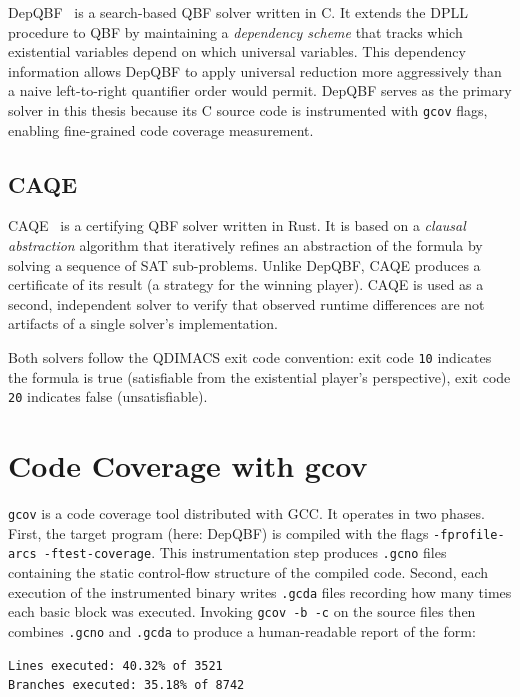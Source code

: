 DepQBF~\cite{LonsingBiere2010} is a search-based QBF solver written in C. It extends the DPLL procedure to QBF by maintaining a \emph{dependency scheme} that tracks which existential variables depend on which universal variables. This dependency information allows DepQBF to apply universal reduction more aggressively than a naive left-to-right quantifier order would permit. DepQBF serves as the primary solver in this thesis because its C source code is instrumented with \texttt{gcov} flags, enabling fine-grained code coverage measurement.

\subsection{CAQE}\label{subsec:caqe}

CAQE~\cite{RabeTentrup2015} is a certifying QBF solver written in Rust. It is based on a \emph{clausal abstraction} algorithm that iteratively refines an abstraction of the formula by solving a sequence of SAT sub-problems. Unlike DepQBF, CAQE produces a certificate of its result (a strategy for the winning player). CAQE is used as a second, independent solver to verify that observed runtime differences are not artifacts of a single solver's implementation.

Both solvers follow the QDIMACS exit code convention: exit code \texttt{10} indicates the formula is true (satisfiable from the existential player's perspective), exit code \texttt{20} indicates false (unsatisfiable).

\section{Code Coverage with gcov}\label{sec:gcov}

\texttt{gcov} is a code coverage tool distributed with GCC. It operates in two phases. First, the target program (here: DepQBF) is compiled with the flags \texttt{-fprofile-arcs -ftest-coverage}. 
This instrumentation step produces \texttt{.gcno} files containing the static control-flow structure of the compiled code. 
Second, each execution of the instrumented binary writes \texttt{.gcda} files recording how many times each basic block was executed. 
Invoking \texttt{gcov -b -c} on the source files then combines 
\texttt{.gcno} and \texttt{.gcda} to produce a human-readable 
report of the form:

\begin{verbatim}
Lines executed: 40.32% of 3521
Branches executed: 35.18% of 8742
\end{verbatim}

